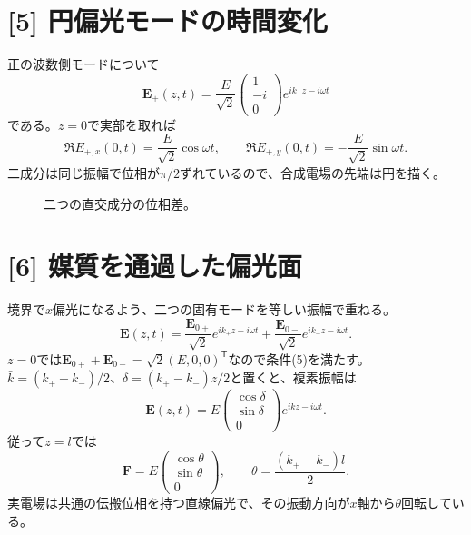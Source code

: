 \documentclass[11pt,a4paper]{article}
\begin{document}
\section*{[5] 円偏光モードの時間変化}
正の波数側モードについて
\begin{equation}
 \boldsymbol E_+(z,t)=\frac{E}{\sqrt2}
 \begin{pmatrix}1\\-i\\0\end{pmatrix}e^{ik_+z-i\omega t}
\end{equation}
である。$z=0$で実部を取れば
\begin{equation}
 \Re E_{+,x}(0,t)=\frac{E}{\sqrt2}\cos\omega t,\qquad
 \Re E_{+,y}(0,t)=-\frac{E}{\sqrt2}\sin\omega t.
\end{equation}
二成分は同じ振幅で位相が$\pi/2$ずれているので、合成電場の先端は円を描く。
\begin{figure}[htbp]
\centering
{}
\caption{二つの直交成分の位相差。}
\end{figure}

\section*{[6] 媒質を通過した偏光面}
境界で$x$偏光になるよう、二つの固有モードを等しい振幅で重ねる。
\begin{equation}
 \boldsymbol E(z,t)=\frac{\boldsymbol E_{0+}}{\sqrt2}e^{ik_+z-i\omega t}
 +\frac{\boldsymbol E_{0-}}{\sqrt2}e^{ik_-z-i\omega t}.
\end{equation}
$z=0$では$\boldsymbol E_{0+}+\boldsymbol E_{0-}=\sqrt2(E,0,0)^{\mathsf T}$なので条件(5)を満たす。$\bar k=(k_++k_-)/2$、$\delta=(k_+-k_-)z/2$と置くと、複素振幅は
\begin{equation}
 \boldsymbol E(z,t)=E\begin{pmatrix}\cos\delta\\\sin\delta\\0\end{pmatrix}
 e^{i\bar k z-i\omega t}.
\end{equation}
従って$z=l$では
\begin{equation}
 \boxed{\boldsymbol F=E\begin{pmatrix}\cos\theta\\\sin\theta\\0\end{pmatrix},\qquad
 \theta=\frac{(k_+-k_-)l}{2}}.
\end{equation}
実電場は共通の伝搬位相を持つ直線偏光で、その振動方向が$x$軸から$\theta$回転している。
\end{document}
